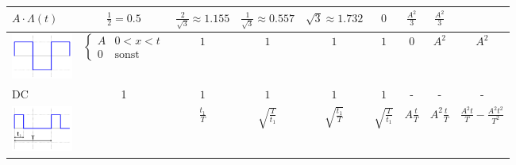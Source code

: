 \begin{table}
\begin{tabular}{|l|c|c|c|c|c|c|c|c|}
	$A\cdot\Lambda(t)$ &
	$\frac{1}{2}= 0.5$ &
	$\frac{2}{\sqrt{3}}\approx 1.155$ &
	$\frac{1}{\sqrt{3}}
	\approx 0.557$ &
	$\sqrt{3} \approx 1.732$ &
	$0$ &
	$\frac{A^2}{3}$ &
	$\frac{A^2}{3}$ \\
\hline	
	\includegraphics[width=2cm]{idiotenseite/images/table_square_wave.png} &
	$\begin{cases} A & 0<x<t \\ 0 & \textrm{sonst}\end{cases}$ &
	$1$ &
	$1$ &
	$1$ &
	$1$ &
	$0$ &
	$A^2$ &
	$A^2$ \\
\hline	
	DC&
	1&
	$1$ &
	$1$ &
	$1$ &
	$1$  &
	-&
	-&
	-\\
\hline	
	\includegraphics[width=2cm]{idiotenseite/images/table_pulse_wide_wave.png} &
	&
	$\frac{t_1}{T}$ & $\sqrt{\frac{T}{t_1}}$ & $\sqrt{\frac{t_1}{T}}$ & $\sqrt{\frac{T}{t_1}}$ &
	$A\frac{t}{T}$ &
	$A^2\frac{t}{T}$ &
	$\frac{A^2t}{T}-\frac{A^2t^2}{T^2}$\\
\hline
\end{tabular}
\end{table}

